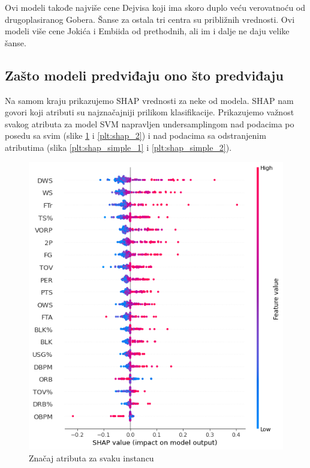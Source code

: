 \documentclass[a4paper]{article}
\begin{document}
Ovi modeli takođe najviše cene Dejvisa koji ima skoro duplo veću verovatnoću od drugoplasiranog Gobera. Šanse za ostala tri centra su približnih vrednosti. Ovi modeli više cene Jokića i Embiida od prethodnih, ali im i dalje ne daju velike šanse.

\subsection{Zašto modeli predviđaju ono što predviđaju}
\label{subsec:modeli_pred}

Na samom kraju prikazujemo SHAP vrednosti za neke od modela. SHAP nam govori koji atributi su najznačajniji prilikom klasifikacije. Prikazujemo važnost svakog atributa za model SVM napravljen undersamplingom nad podacima po posedu sa svim (slike \ref{plt:shap_1} i \ref{plt:shap_2}) i nad podacima sa odstranjenim atributima (slika \ref{plt:shap_simple_1} i \ref{plt:shap_simple_2}).

\begin{figure}[h!]
\begin{center}
\includegraphics[scale=0.4]{shap_1.png}
\end{center}
\caption{Značaj atributa za svaku instancu}
\label{plt:shap_1}
\end{figure}
\end{document}
